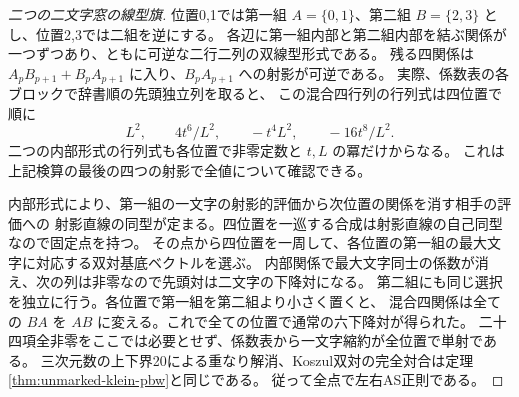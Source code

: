 \begin{proof}[二つの二文字窓の線型旗]
位置0,1では第一組 $A=\{0,1\}$、第二組 $B=\{2,3\}$ とし、位置2,3では二組を逆にする。
各辺に第一組内部と第二組内部を結ぶ関係が一つずつあり、ともに可逆な二行二列の双線型形式である。
残る四関係は $A_p B_{p+1}+B_p A_{p+1}$ に入り、$B_p A_{p+1}$ への射影が可逆である。
実際、係数表の各ブロックで辞書順の先頭独立列を取ると、
この混合四行列の行列式は四位置で順に
\[
           L^2,\qquad 4t^6/L^2,\qquad -t^4 L^2,\qquad -16t^8/L^2 .
\]
二つの内部形式の行列式も各位置で非零定数と $t,L$ の冪だけからなる。
これは上記検算の最後の四つの射影で全値について確認できる。

内部形式により、第一組の一文字の射影的評価から次位置の関係を消す相手の評価への
射影直線の同型が定まる。四位置を一巡する合成は射影直線の自己同型なので固定点を持つ。
その点から四位置を一周して、各位置の第一組の最大文字に対応する双対基底ベクトルを選ぶ。
内部関係で最大文字同士の係数が消え、次の列は非零なので先頭対は二文字の下降対になる。
第二組にも同じ選択を独立に行う。各位置で第一組を第二組より小さく置くと、
混合四関係は全ての $BA$ を $AB$ に変える。これで全ての位置で通常の六下降対が得られた。
二十四項全非零をここでは必要とせず、係数表から一文字縮約が全位置で単射である。
三次元数の上下界20による重なり解消、Koszul双対の完全対合は定理\ref{thm:unmarked-klein-pbw}と同じである。
従って全点で左右AS正則である。
\end{proof}
